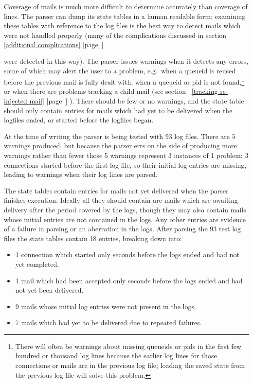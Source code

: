 \documentclass[a4paper,12pt,draft]{article}
\newcommand{\refwithpage}[1]{%
    \empty{}\ref{#1} [page~\pageref{#1}]%
}
\begin{document}
Coverage of mails is much more difficult to determine accurately than
coverage of lines.  The parser can dump its state tables in a human
readable form; examining these tables with reference to the log files is
the best way to detect mails which were not handled properly (many of the
complications discussed in section~\refwithpage{additional complications}
were detected in this way).  The parser issues warnings when it detects any
errors, some of which may alert the user to a problem, e.g.\ when a queueid
is reused before the previous mail is fully dealt with, when a queueid or
pid is not found,\footnote{There will often be warnings about missing
queueids or pids in the first few hundred or thousand log lines because the
earlier log lines for those connections or mails are in the previous log
file; loading the saved state from the previous log file will solve this
problem.} or when there are problems tracking a child mail (see
section~\refwithpage{tracking re-injected mail}).  There should be few or
no warnings, and the state table should only contain entries for mails
which had yet to be delivered when the logfiles ended, or started before
the logfiles began.

At the time of writing the parser is being tested with 93 log files.  There
are 5 warnings produced, but because the parser errs on the side of
producing more warnings rather than fewer those 5 warnings represent 3
instances of 1 problem: 3 connections started before the first log file, so
their initial log entries are missing, leading to warnings when their log
lines are parsed.

The state tables contain entries for mails not yet delivered when the
parser finishes execution.  Ideally all they should contain are mails which
are awaiting delivery after the period covered by the logs, though they may
also contain mails whose initial entries are not contained in the logs.
Any other entries are evidence of a failure in parsing or an aberration in
the logs.  After parsing the 93 test log files the state tables contain 18
entries, breaking down into:

\begin{itemize}

    \item 1 connection which started only seconds before the logs ended and
        had not yet completed.

    \item 1 mail which had been accepted only seconds before the logs ended
        and had not yet been delivered.

    \item 9 mails whose initial log entries were not present in the logs.

    \item 7 mails which had yet to be delivered due to repeated failures.

\end{itemize}
\end{document}
